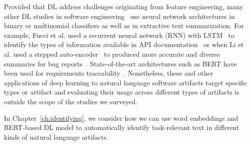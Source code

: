 




Provided that \acs{DL} address challenges originating from feature engineering, 
many other \acs{DL} studies in software engineering~\cite{ferreira2021,li2018deep, watson2022}
use neural network architectures 
in binary or multinomial classifiers as well as in extractive text summarization.
For example, Fucci et al. used a 
recurrent neural network (\acs{RNN}) with 
\acf{LSTM}~\cite{aa}
to identify the types of information available in 
API documentation~\cite{fucci2019} or when Li et al. used a stepped auto-encoder~\cite{aa}
to produced more accurate and diverse summaries 
for bug reports~\cite{li2018deep}.
State-of-the-art architectures such as \acf{BERT}
have been used for requirements traceability~\cite{Araujo2021}.
Nonetheless, these and other applications of deep learning 
to natural language software artifacts target specific
types or artifact and evaluating their 
usage across different types of artifacts 
is outside the scope of the studies we surveyed.



In Chapter~\ref{ch:identifying}, we consider 
how we can use 
word embeddings and \acs{BERT}-based \acs{DL}
model 
to automatically identify task-relevant text
in different kinds of natural language artifacts.

